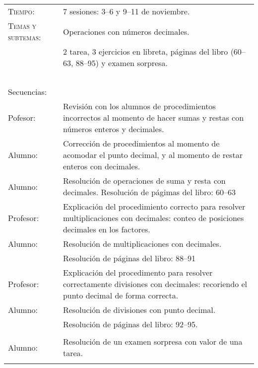 \documentclass[letterpaper,10pt]{article}
\begin{document}
\begin{tabular}[t]{R{0.25\textwidth}p{0.71\textwidth}}

\hline

    \textsc{Tiempo:}                    & 7 sesiones: 3--6 y 9--11  de noviembre. \\
    \textsc{Temas y subtemas:}          & Operaciones con n\'umeros decimales.\\
              & 2 tarea, 3 ejercicios en libreta, p\'aginas del libro (60--63, 88--95) y examen sorpresa. \\ \\
    \large{\sc Secuencias:} \\
    Pofesor:    & Revisi\'on con los alumnos de procedimientos incorrectos al momento de hacer sumas y restas con n\'umeros enteros y decimales. \\
    Alumno:     & Correcci\'on de procedimientos al momento de acomodar el punto decimal, y al momento de restar enteros con decimales.\\
    Alumno:     & Resoluci\'on de operaciones de suma y resta con decimales. Resolución de p\'agimas del libro: 60--63 \\
    Profesor:   & Explicaci\'on del procedimiento correcto para resolver multiplicaciones con decimales: conteo de posiciones decimales en los factores. \\

    Alumno:     & Resoluci\'on de multiplicaciones con decimales. \\
                & Resoluci\'on de p\'aginas del libro: 88--91 \\
    Profesor:   & Explicaci\'on del procedimento para resolver correctamente divisiones con decimales: recoriendo el punto decimal de forma correcta. \\
    Alumno:     & Resoluci\'on de divisiones con punto decimal. \\ 
                & Resoluci\'on de p\'aginas del libro: 92--95. \\ \\
    Alumno:     & Resoluci\'on de un examen sorpresa con valor de una tarea.
\\ \hline \\
\end{tabular}
\end{document}
